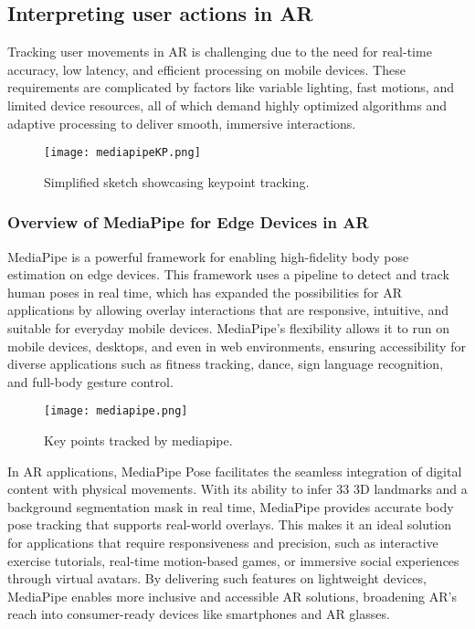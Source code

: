 \subsection{ Interpreting user actions in AR}

Tracking user movements in AR is challenging due to the need for real-time accuracy, low latency, and efficient processing on mobile devices.
These requirements are complicated by factors like variable lighting, fast motions, and limited device resources, all of which demand highly optimized algorithms and adaptive processing to deliver smooth, immersive interactions.

\begin{figure}[!h]
    \centering
    \texttt{[image: mediapipeKP.png]}
    \caption{Simplified sketch showcasing keypoint tracking.}
    \vspace{0.1cm}
    \label{fig:kptracking}
\end{figure}

\subsubsection{Overview of MediaPipe for Edge Devices in AR}

MediaPipe\cite{lugaresi2019mediapipe} is a powerful framework for enabling high-fidelity body pose estimation on edge devices.
This framework uses a pipeline to detect and track human poses in real time, which has expanded the possibilities for AR applications by allowing overlay interactions that are responsive, intuitive, and suitable for everyday mobile devices.
MediaPipe's flexibility allows it to run on mobile devices, desktops, and even in web environments, ensuring accessibility for diverse applications such as fitness tracking, dance, sign language recognition, and full-body gesture control.

\begin{figure}[!h]
    \centering
    \texttt{[image: mediapipe.png]}
    \caption{Key points tracked by mediapipe.}
    \vspace{0.1cm}
    \label{fig:mediapipe}
\end{figure}

In AR applications, MediaPipe Pose facilitates the seamless integration of digital content with physical movements.
With its ability to infer 33 3D landmarks and a background segmentation mask in real time, MediaPipe provides accurate body pose tracking that supports real-world overlays.
This makes it an ideal solution for applications that require responsiveness and precision, such as interactive exercise tutorials, real-time motion-based games, or immersive social experiences through virtual avatars.
By delivering such features on lightweight devices, MediaPipe enables more inclusive and accessible AR solutions, broadening AR’s reach into consumer-ready devices like smartphones and AR glasses.

